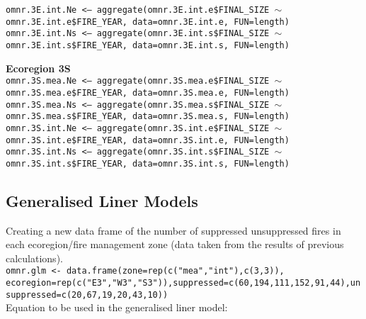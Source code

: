 \begin{spacing}{1.5}
\noindent \texttt{omnr.3E.int.Ne <-- aggregate(omnr.3E.int.e\$FINAL\_SIZE $\sim$ omnr.3E.int.\linebreak e\$FIRE\_YEAR, data=omnr.3E.int.e, FUN=length)} \\

\noindent \texttt{omnr.3E.int.Ns <-- aggregate(omnr.3E.int.s\$FINAL\_SIZE $\sim$ omnr.3E.int.\linebreak s\$FIRE\_YEAR, data=omnr.3E.int.s, FUN=length)} \\

\clearpage

\noindent \textbf{Ecoregion 3S} \\

\noindent \texttt{omnr.3S.mea.Ne <-- aggregate(omnr.3S.mea.e\$FINAL\_SIZE $\sim$ omnr.3S.mea.\linebreak e\$FIRE\_YEAR, data=omnr.3S.mea.e, FUN=length)} \\

\noindent \texttt{omnr.3S.mea.Ns <-- aggregate(omnr.3S.mea.s\$FINAL\_SIZE $\sim$ omnr.3S.mea.\linebreak s\$FIRE\_YEAR, data=omnr.3S.mea.s, FUN=length)} \\

\noindent \texttt{omnr.3S.int.Ne <-- aggregate(omnr.3S.int.e\$FINAL\_SIZE $\sim$ omnr.3S.int.\linebreak e\$FIRE\_YEAR, data=omnr.3S.int.e, FUN=length)} \\

\noindent \texttt{omnr.3S.int.Ns <-- aggregate(omnr.3S.int.s\$FINAL\_SIZE $\sim$ omnr.3S.int.\linebreak s\$FIRE\_YEAR, data=omnr.3S.int.s, FUN=length)} 

\subsection{Generalised Liner Models}
Creating a new data frame of the number of suppressed unsuppressed fires in each ecoregion/fire management zone (data taken from the results of previous calculations). \\

\noindent \texttt{omnr.glm <- data.frame(zone=rep(c("mea","int"),c(3,3)), ecoregion=\linebreak rep(c("E3","W3","S3")),suppressed=c(60,194,111,152,91,44),\linebreak unsuppressed=c(20,67,19,20,43,10))} \\

\noindent Equation to be used in the generalised liner model: \\


\end{spacing}
